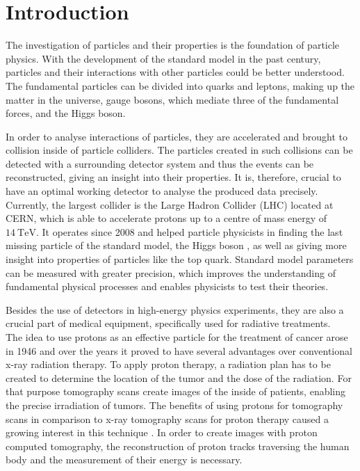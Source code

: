 \chapter{Introduction}
The investigation of particles and their properties is the foundation of particle physics. With the development of the standard model in the past century, particles
and their interactions with other particles could be better understood. The fundamental particles can be divided into quarks and leptons, making up the matter in the universe,
gauge bosons, which mediate three of the fundamental forces, and the Higgs boson.

In order to analyse interactions of particles, they are accelerated and brought to collision inside of particle colliders. The particles created in such collisions
can be detected with a surrounding detector system and thus the events can be reconstructed, giving an insight into their properties. It is, therefore, crucial to have
an optimal working detector to analyse the produced data precisely.
Currently, the largest collider is
the Large Hadron Collider (LHC) \cite{lhc} located at CERN, which is able to accelerate protons up to
a centre of mass energy of $\SI{14}{\tera\eV}$.
It operates since 2008 and helped particle physicists in finding the last missing particle of the standard model, the Higgs boson \cite{higgs}\cite{higgs_cms}, as well as giving more insight
into properties of particles like the top quark. Standard model parameters can be measured with greater precision, which improves the understanding of fundamental physical processes
and enables physicists to test their theories. %

Besides the use of detectors in high-energy physics experiments, they are also a crucial part of medical equipment, specifically used for radiative treatments. \\
The idea to use protons as an effective particle for the treatment of cancer arose in 1946 \cite{1946} and over the years it proved to have several advantages over
conventional x-ray radiation therapy. To apply proton therapy, a radiation plan has to be created to determine the location of the tumor and the dose of the radiation.
For that purpose tomography scans create images of the inside of patients, enabling the precise irradiation of tumors.
The benefits of using protons for tomography scans in comparison to x-ray tomography scans for proton therapy caused a growing interest in this technique \cite{pbt}.
In order to create images with proton computed tomography, the reconstruction of proton tracks traversing the human body and the measurement of their energy is necessary.

